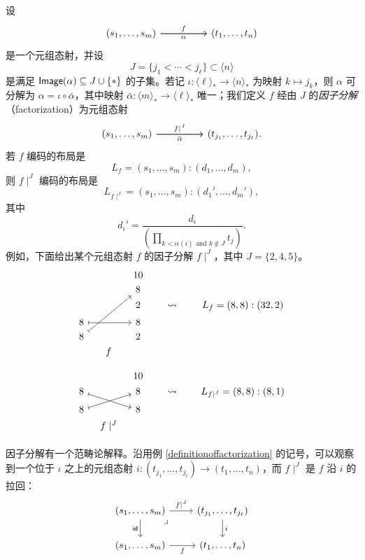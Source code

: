 \begin{example}[因子分解]\label{definitionoffactorization}
设
\[\begin{tikzcd} (s_1,\dots,s_m) \ar[rr,"f"] \ar[rr,swap,"\alpha"] & &  (t_1,\dots,t_n)
    \end{tikzcd} \]
是一个元组态射，并设
\[J = \{j_1< \cdots < j_\ell\} \subset \langle n \rangle\]
是满足 $\mathsf{Image}(\alpha) \subseteq J \cup \{*\}$ 的子集。若记 $\iota:\langle \ell \rangle_* \to \langle n \rangle_*$ 为映射 $k\mapsto j_k$，则 $\alpha$ 可分解为 $\alpha = \iota \circ \bar{\alpha}$，其中映射 $\bar{\alpha}: \langle m \rangle_* \to \langle \ell \rangle_*$ 唯一；我们定义 $f$ 经由 $J$ 的{\it 因子分解}（factorization）为元组态射
\[\begin{tikzcd} (s_1,\dots,s_m) \ar[rr,"f\mid^J"] \ar[rr,swap,"\bar{\alpha}"] & &  (t_{j_1},\dots,t_{j_\ell}).
    \end{tikzcd} \]
若 $f$ 编码的布局是
\[L_f = (s_1,\dots,s_m):(d_1,\dots,d_m),\]
则 $f \mid^J$ 编码的布局是
\[L_{f \mid^J} = (s_1,\dots,s_m):(d_1',\dots,d_m'),\]
其中
\[
d_i' = \dfrac{d_i}{\left(\displaystyle\prod_{ k < \alpha(i)\text{ and } k \notin J }t_j\right)}.
\]
例如，下面给出某个元组态射 $f$ 的因子分解 $f \mid^J$，其中 $J = \{2,4,5\}$。
    \[ \begin{tikzcd} [row sep = 1, column sep = 8]
    & & 10 & & & & \\
    & & 8 & & & & \\
    & & 2 & & \rightsquigarrow & & L_f = (8,8):(32,2) \\
    8 \ar[rr,mapsto] & & 8 & & & & \\
    8 \ar[uuurr,mapsto] & & 2 & & & &  \\
    & f & & & & & \\
    & \vspace{5.0in} & & & & & \\
    & & 10 & & & & \\
    8 \ar[drr,mapsto] & & 8 & & \rightsquigarrow & & L_{f\mid^J} = (8,8):(8,1)\\
    8 \ar[urr,mapsto] & & 8 & & & & \\
    & f \mid^J & & & & & \\
    \end{tikzcd}\]
\end{example}

\begin{remark}
    因子分解有一个范畴论解释。沿用例 \ref{definitionoffactorization} 的记号，可以观察到一个位于 $\iota$ 之上的元组态射 $i:(t_{j_1},\dots,t_{j_\ell}) \to (t_1,\dots,t_n)$，而 $f \mid^J$ 是 $f$ 沿 $i$ 的拉回：
    \[ \begin{tikzcd}
    (s_1,\dots,s_m) \ar[r,"f \mid^J"] \ar[d,swap,"\id"] \arrow[dr, phantom, "\lrcorner", very near start] & (t_{j_1},\dots,t_{j_\ell}) \ar[d,"i"] \\
     (s_1,\dots,s_m) \ar[r,swap,"f"] & (t_1,\dots,t_n) \\
    \end{tikzcd} \]
\end{remark}


